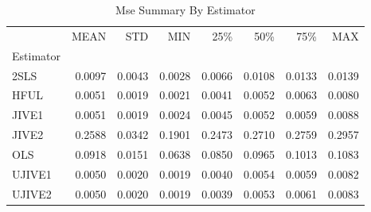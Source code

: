 \begin{table}[ht]
\centering
\caption{Mse Summary By Estimator}
\begin{tabular}{lrrrrrrr}
\toprule
 & MEAN & STD & MIN & 25\% & 50\% & 75\% & MAX \\
Estimator &  &  &  &  &  &  &  \\
\midrule
2SLS & 0.0097 & 0.0043 & 0.0028 & 0.0066 & 0.0108 & 0.0133 & 0.0139 \\
HFUL & 0.0051 & 0.0019 & 0.0021 & 0.0041 & 0.0052 & 0.0063 & 0.0080 \\
JIVE1 & 0.0051 & 0.0019 & 0.0024 & 0.0045 & 0.0052 & 0.0059 & 0.0088 \\
JIVE2 & 0.2588 & 0.0342 & 0.1901 & 0.2473 & 0.2710 & 0.2759 & 0.2957 \\
OLS & 0.0918 & 0.0151 & 0.0638 & 0.0850 & 0.0965 & 0.1013 & 0.1083 \\
UJIVE1 & 0.0050 & 0.0020 & 0.0019 & 0.0040 & 0.0054 & 0.0059 & 0.0082 \\
UJIVE2 & 0.0050 & 0.0020 & 0.0019 & 0.0039 & 0.0053 & 0.0061 & 0.0083 \\
\bottomrule
\end{tabular}
\end{table}
